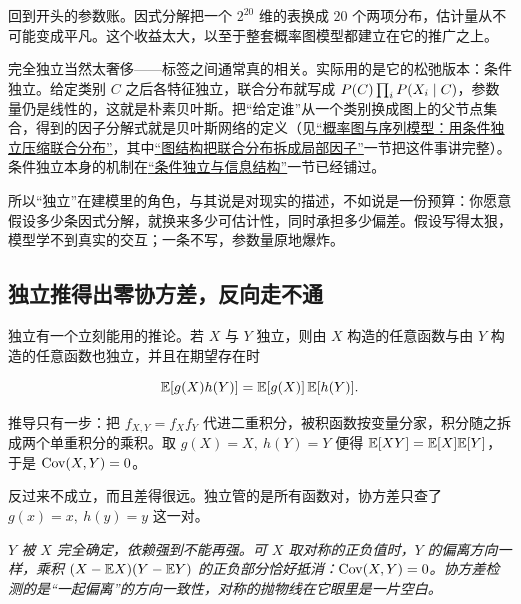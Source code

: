 回到开头的参数账。因式分解把一个 \(2^{20}\) 维的表换成 \(20\) 个两项分布，估计量从不可能变成平凡。这个收益太大，以至于整套概率图模型都建立在它的推广之上。

完全独立当然太奢侈——标签之间通常真的相关。实际用的是它的松弛版本：条件独立。给定类别 \(C\) 之后各特征独立，联合分布就写成 \(P(C)\prod_i P(X_i\mid C)\)，参数量仍是线性的，这就是朴素贝叶斯。把``给定谁''从一个类别换成图上的父节点集合，得到的因子分解式就是贝叶斯网络的定义（见\hyperref[ch:115]{``概率图与序列模型：用条件独立压缩联合分布''}，其中\hyperref[sec:13-Machine-Learning/07-Graphical-and-Sequential-Models/01]{``图结构把联合分布拆成局部因子''}一节把这件事讲完整）。条件独立本身的机制在\hyperref[sec:05-Probability/02-Conditional-Probability/04]{``条件独立与信息结构''}一节已经铺过。

所以``独立''在建模里的角色，与其说是对现实的描述，不如说是一份预算：你愿意假设多少条因式分解，就换来多少可估计性，同时承担多少偏差。假设写得太狠，模型学不到真实的交互；一条不写，参数量原地爆炸。

\subsection{独立推得出零协方差，反向走不通}

独立有一个立刻能用的推论。若 \(X\) 与 \(Y\) 独立，则由 \(X\) 构造的任意函数与由 \(Y\) 构造的任意函数也独立，并且在期望存在时

\[
\mathbb{E}[g(X)h(Y)]=\mathbb{E}[g(X)]\,\mathbb{E}[h(Y)].
\]

推导只有一步：把 \(f_{X,Y}=f_Xf_Y\) 代进二重积分，被积函数按变量分家，积分随之拆成两个单重积分的乘积。取 \(g(X)=X,\ h(Y)=Y\) 便得 \(\mathbb{E}[XY]=\mathbb{E}[X]\mathbb{E}[Y]\)，于是 \(\operatorname{Cov}(X,Y)=0\)。

反过来不成立，而且差得很远。独立管的是所有函数对，协方差只查了 \(g(x)=x,\ h(y)=y\) 这一对。

\begin{center}

\emph{\(Y\) 被 \(X\) 完全确定，依赖强到不能再强。可 \(X\) 取对称的正负值时，\(Y\) 的偏离方向一样，乘积 \((X-\mathbb{E} X)(Y-\mathbb{E} Y)\) 的正负部分恰好抵消：\(\operatorname{Cov}(X,Y)=0\)。协方差检测的是``一起偏离''的方向一致性，对称的抛物线在它眼里是一片空白。}
\end{center}

